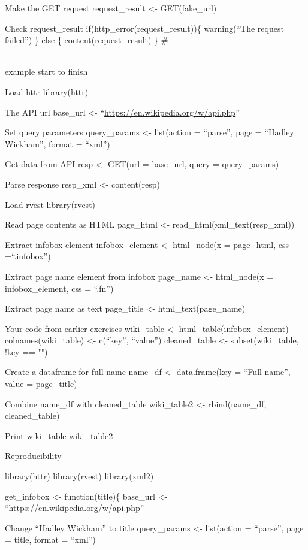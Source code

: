 \documentclass[]{book}
\begin{document}
Make the GET request
request\_result \textless{}- GET(fake\_url)

Check request\_result
if(http\_error(request\_result))\{
warning(``The request failed'')
\} else \{
content(request\_result)
\}
\#---------------------------------------------------------------

example start to finish

Load httr
library(httr)

The API url
base\_url \textless{}- ``\url{https://en.wikipedia.org/w/api.php}''

Set query parameters
query\_params \textless{}- list(action = ``parse'',
page = ``Hadley Wickham'',
format = ``xml'')

Get data from API
resp \textless{}- GET(url = base\_url, query = query\_params)

Parse response
resp\_xml \textless{}- content(resp)

Load rvest
library(rvest)

Read page contents as HTML
page\_html \textless{}- read\_html(xml\_text(resp\_xml))

Extract infobox element
infobox\_element \textless{}- html\_node(x = page\_html, css =``.infobox'')

Extract page name element from infobox
page\_name \textless{}- html\_node(x = infobox\_element, css = ``.fn'')

Extract page name as text
page\_title \textless{}- html\_text(page\_name)

Your code from earlier exercises
wiki\_table \textless{}- html\_table(infobox\_element)
colnames(wiki\_table) \textless{}- c(``key'', ``value'')
cleaned\_table \textless{}- subset(wiki\_table, !key == "")

Create a dataframe for full name
name\_df \textless{}- data.frame(key = ``Full name'', value = page\_title)

Combine name\_df with cleaned\_table
wiki\_table2 \textless{}- rbind(name\_df, cleaned\_table)

Print wiki\_table
wiki\_table2

Reproducibility

library(httr)
library(rvest)
library(xml2)

get\_infobox \textless{}- function(title)\{
base\_url \textless{}- ``\url{https://en.wikipedia.org/w/api.php}''

Change ``Hadley Wickham'' to title
query\_params \textless{}- list(action = ``parse'',
page = title,
format = ``xml'')
\end{document}

